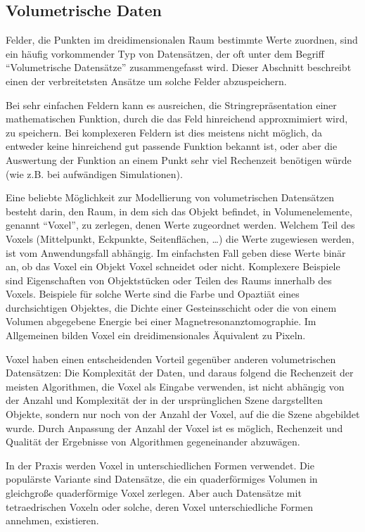 \documentclass[a4paper,fontsize=12pt,toc=bib,halfparskip]{scrartcl}
\begin{document}
\subsection{Volumetrische Daten}
Felder, die Punkten im dreidimensionalen Raum bestimmte Werte zuordnen, sind ein h\"aufig vorkommender Typ von Datens\"atzen, der oft unter dem Begriff ``Volumetrische Datens\"atze'' zusammengefasst wird. Dieser Abschnitt beschreibt einen der verbreitetsten Ans\"atze um solche Felder abzuspeichern.  

Bei sehr einfachen Feldern kann es ausreichen, die Stringrepr\"asentation einer mathematischen Funktion, durch die das Feld hinreichend approxmimiert wird, zu speichern. Bei komplexeren Feldern ist dies meistens nicht m\"oglich, da entweder keine hinreichend gut passende Funktion bekannt ist, oder aber die Auswertung der Funktion an einem Punkt sehr viel Rechenzeit ben\"otigen w\"urde (wie z.B. bei aufw\"andigen Simulationen). 

Eine beliebte M\"oglichkeit zur Modellierung von volumetrischen Datens\"atzen besteht darin, den Raum, in dem sich das Objekt befindet, in Volumenelemente, genannt ``Voxel'', zu zerlegen, denen Werte zugeordnet werden. Welchem Teil des Voxels (Mittelpunkt, Eckpunkte, Seitenfl\"achen, \dots) die Werte zugewiesen werden, ist vom Anwendungsfall abh\"angig. Im einfachsten Fall geben diese Werte bin\"ar an, ob das Voxel ein Objekt Voxel schneidet oder nicht. Komplexere Beispiele sind Eigenschaften von Objektst\"ucken oder Teilen des Raums innerhalb des Voxels. Beispiele f\"ur solche Werte sind die Farbe und Opazti\"at eines durchsichtigen Objektes, die Dichte einer Gesteinsschicht oder die von einem Volumen abgegebene Energie bei einer Magnetresonanztomographie. Im Allgemeinen bilden Voxel ein dreidimensionales \"Aquivalent zu Pixeln.

Voxel haben einen entscheidenden Vorteil gegen\"uber anderen volumetrischen Datens\"atzen: Die Komplexit\"at der Daten, und daraus folgend die Rechenzeit der meisten Algorithmen, die Voxel als Eingabe verwenden, ist nicht abh\"angig von der Anzahl und Komplexit\"at der in der urspr\"unglichen Szene dargstellten Objekte, sondern  nur noch von der Anzahl der Voxel, auf die die Szene abgebildet wurde. Durch Anpassung der Anzahl der Voxel ist es m\"oglich, Rechenzeit und Qualit\"at der Ergebnisse von Algorithmen gegeneinander abzuw\"agen.

In der Praxis werden Voxel in unterschiedlichen Formen verwendet. Die popul\"arste Variante sind Datens\"atze, die ein quaderf\"ormiges Volumen in gleichgro{\ss}e quaderf\"ormige Voxel zerlegen. Aber auch Datens\"atze mit tetraedrischen Voxeln oder solche, deren Voxel unterschiedliche Formen annehmen, existieren. 
\end{document}
